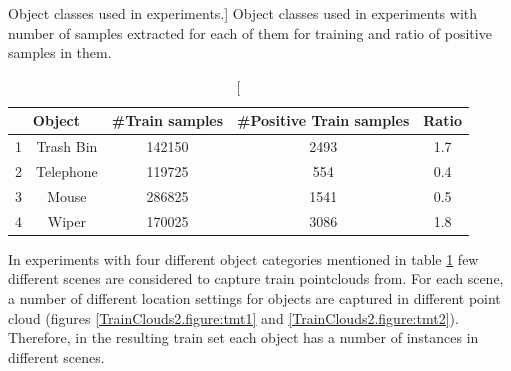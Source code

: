 \begin{table}
\centering
\caption
[Object classes used in experiments.]
{Object classes used in experiments with number of samples extracted for each of them for training and ratio of positive samples in them.}
\label{Objects.table}
\begin{tabular}{|c|c|c|c|c|}
\hline
\multicolumn{2}{|c|}{Object} & \#Train samples & \#Positive Train samples & Ratio \\
\hline
      1 & Trash Bin & 142150 & 2493 & 1.7 \\
\hline
      2 & Telephone   & 119725 & 554  & 0.4 \\
\hline
      3 & Mouse     & 286825 & 1541 & 0.5 \\
\hline
      4 & Wiper     & 170025 & 3086 & 1.8 \\
\hline

\end{tabular}
\end{table}


In experiments with four different object categories mentioned in table \ref{Objects.table} few different scenes are considered to capture train pointclouds from.
For each scene, a number of different location settings for objects are captured in different point cloud (figures \ref{TrainClouds2.figure:tmt1} and \ref{TrainClouds2.figure:tmt2}).
Therefore, in the resulting train set each object has a number of instances in different scenes.


